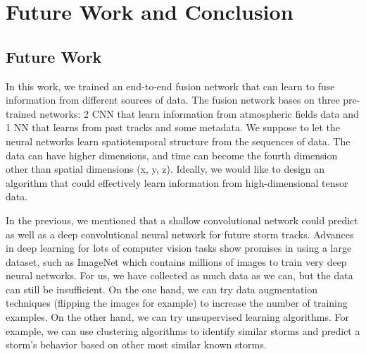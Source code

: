 \chapter{Future Work and Conclusion}
\section{Future Work}
In this work, we trained an end-to-end fusion network that can learn to fuse information from different sources of data. The fusion network bases on three pre-trained networks: 2 CNN that learn information from atmospheric fields data and 1 NN that learns from past tracks and some metadata. We suppose to let the neural networks learn spatiotemporal structure from the sequences of data. The data can have higher dimensions, and time can become the fourth dimension other than spatial dimensions (x, y, z). Ideally, we would like to design an algorithm that could effectively learn information from high-dimensional tensor data. 

In the previous, we mentioned that a shallow convolutional network could predict as well as a deep convolutional neural network for future storm tracks. Advances in deep learning for lots of computer vision tasks show promises in using a large dataset, such as ImageNet which contains millions of images to train very deep neural networks. For us, we have collected as much data as we can, but the data can still be insufficient. On the one hand, we can try data augmentation techniques (flipping the images for example) to increase the number of training examples. On the other hand, we can try unsupervised learning algorithms. For example, we can use clustering algorithms to identify similar storms and predict a storm's behavior based on other most similar known storms.

